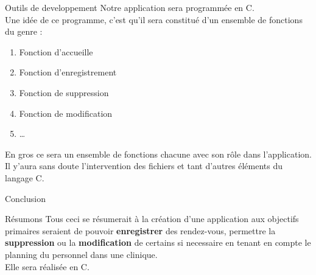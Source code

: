 \documentclass{beamer}
\begin{document}
\begin{frame}{Outils de developpement}
Notre application sera programmée en C. \\
Une idée de ce programme, c’est qu’il sera constitué d’un ensemble de fonctions du genre : \\
\begin{enumerate}
\item Fonction d’accueille \pause
\item Fonction d’enregistrement \pause
\item Fonction de suppression \pause
\item Fonction de modification \pause
\item …\\
\end{enumerate}
En gros ce sera un ensemble de fonctions chacune avec son rôle dans l’application. Il y’aura sans doute l’intervention des fichiers et tant d’autres éléments du langage C.
\end{frame}
\begin{frame}{Conclusion}
\begin{block}{Résumons}
Tous ceci se résumerait à la création d'une application aux objectifs primaires seraient de pouvoir \textbf{enregistrer} des rendez-vous, permettre la \textbf{suppression} ou la \textbf{modification} de certains si necessaire en tenant en compte le planning du personnel dans une clinique.\\Elle sera réalisée en C.
\end{block} 
\end{frame}
\end{document}
